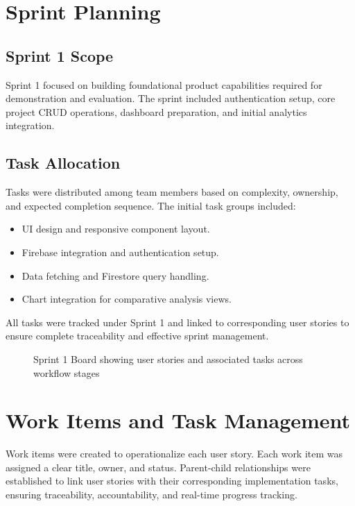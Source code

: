 \documentclass[12pt,a4paper]{article}
\begin{document}
\section{Sprint Planning}
\subsection{Sprint 1 Scope}
Sprint 1 focused on building foundational product capabilities required for demonstration and evaluation. The sprint included authentication setup, core project CRUD operations, dashboard preparation, and initial analytics integration.

\subsection{Task Allocation}
Tasks were distributed among team members based on complexity, ownership, and expected completion sequence. The initial task groups included:
\begin{itemize}
    \item UI design and responsive component layout.
    \item Firebase integration and authentication setup.
    \item Data fetching and Firestore query handling.
    \item Chart integration for comparative analysis views.
\end{itemize}

All tasks were tracked under Sprint 1 and linked to corresponding user stories to ensure complete traceability and effective sprint management.

\begin{figure}[H]
\centering
{}
\caption{Sprint 1 Board showing user stories and associated tasks across workflow stages}
\end{figure}
\section{Work Items and Task Management}

Work items were created to operationalize each user story. Each work item was assigned a clear title, owner, and status. Parent-child relationships were established to link user stories with their corresponding implementation tasks, ensuring traceability, accountability, and real-time progress tracking.
\end{document}
